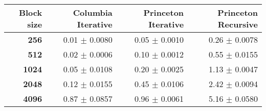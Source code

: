 \begin{tabular}{rrrr}\toprule
\textbf{Block size}  & \textbf{Columbia Iterative} & \textbf{Princeton Iterative} & \textbf{Princeton Recursive}\\\midrule
\textbf{256}  & 0.01 $\pm$ 0.0080 & 0.05 $\pm$ 0.0010 & 0.26 $\pm$ 0.0078\\
\textbf{512}  & 0.02 $\pm$ 0.0006 & 0.10 $\pm$ 0.0012 & 0.55 $\pm$ 0.0155\\
\textbf{1024}  & 0.05 $\pm$ 0.0108 & 0.20 $\pm$ 0.0025 & 1.13 $\pm$ 0.0047\\
\textbf{2048}  & 0.12 $\pm$ 0.0155 & 0.45 $\pm$ 0.0106 & 2.42 $\pm$ 0.0094\\
\textbf{4096} & 0.87 $\pm$ 0.0857 & 0.96 $\pm$ 0.0061 & 5.16 $\pm$ 0.0580\\
\bottomrule
\end{tabular}
